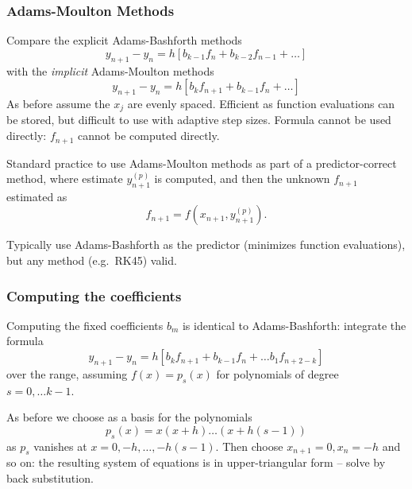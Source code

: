 \documentclass{beamer}
\begin{document}
\begin{frame}
  \frametitle{Adams-Moulton Methods}

  \begin{overlayarea}{\textwidth}{0.9\textheight}
    {
      Compare the explicit Adams-Bashforth methods
      \begin{equation*}
        y_{n+1} - y_n = h\left[ b_{k-1} f_n + b_{k-2} f_{n-1} + \dots \right]
      \end{equation*}
      with the \emph{implicit} Adams-Moulton methods
      \begin{equation*}
        y_{n+1} - y_n = h \left[ b_k f_{n+1} + b_{k-1} f_{n} + \dots \right]
      \end{equation*}
    }
    {
      As before assume the $x_j$ are evenly spaced.  Efficient as
      function evaluations can be stored, but difficult to use with
      adaptive step sizes.
    }
    {
      Formula cannot be used directly: $f_{n+1}$ cannot be
      computed directly.
    }
    {

      \vspace{1ex}

      Standard practice to use Adams-Moulton methods as part of a
      predictor-correct method, where estimate $y^{(p)}_{n+1}$ is
      computed, and then the unknown $f_{n+1}$ estimated as
      \begin{equation*}
        f_{n+1} = f(x_{n+1}, y^{(p)}_{n+1}).
      \end{equation*}
    }
    {
      Typically use Adams-Bashforth as the predictor (minimizes
      function evaluations), but any method (e.g.\ RK45) valid.
    }
  \end{overlayarea}

\end{frame}

\begin{frame}
  \frametitle{Computing the coefficients}

  Computing the fixed coefficients $b_m$ is identical to
  Adams-Bashforth: integrate the formula
  \begin{equation*}
    y_{n+1} - y_n = h \left[ b_k f_{n+1} + b_{k-1} f_{n} + \dots b_1
      f_{n+2-k} \right]
  \end{equation*}
  over the range, assuming $f(x) = p_s(x)$ for polynomials of degree
  $s = 0, \dots k-1$. \pause

  \vspace{1ex}

  As before we choose as a basis for the polynomials
  \begin{equation*}
    p_s(x) = x (x + h) \dots (x + h (s-1))
  \end{equation*}
  as $p_s$ vanishes at $x = 0, -h, \dots, -h (s-1)$. \pause Then choose
  $x_{n+1} = 0, x_{n} = -h$ and so on: the resulting system of
  equations is in upper-triangular form -- solve by back substitution.

\end{frame}
\end{document}
